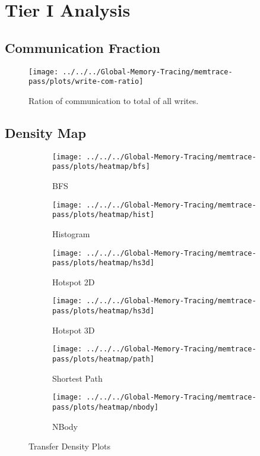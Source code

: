 \section{Tier I Analysis}
\subsection{Communication Fraction}
\begin{figure}[t]
	\centering
	\texttt{[image: ../../../Global-Memory-Tracing/memtrace-pass/plots/write-com-ratio]}
	\caption{Ration of communication to total of all writes.}
	\label{com-ratio}
\end{figure}
\subsection{Density Map}
\begin{figure}
	\begin{subfigure}[b]{0.45\textwidth}
		\texttt{[image: ../../../Global-Memory-Tracing/memtrace-pass/plots/heatmap/bfs]}
		\caption{BFS}
		\label{fig:density-bfs}
	\end{subfigure}
	\begin{subfigure}[b]{0.45\textwidth}
		\texttt{[image: ../../../Global-Memory-Tracing/memtrace-pass/plots/heatmap/hist]}
		\caption{Histogram}
		\label{fig:density-hist}
	\end{subfigure}
	\begin{subfigure}[b]{0.45\textwidth}
		\texttt{[image: ../../../Global-Memory-Tracing/memtrace-pass/plots/heatmap/hs3d]}
		\caption{Hotspot 2D}
		\label{fig:density-hs2d}
	\end{subfigure}
	\begin{subfigure}[b]{0.45\textwidth}
		\texttt{[image: ../../../Global-Memory-Tracing/memtrace-pass/plots/heatmap/hs3d]}
		\caption{Hotspot 3D}
		\label{fig:density-hs3d}
	\end{subfigure}
	\begin{subfigure}[b]{0.45\textwidth}
		\texttt{[image: ../../../Global-Memory-Tracing/memtrace-pass/plots/heatmap/path]}
		\caption{Shortest Path}
		\label{fig:density-path}
	\end{subfigure}
	\hfill
	\begin{subfigure}[b]{0.45\textwidth}
		\texttt{[image: ../../../Global-Memory-Tracing/memtrace-pass/plots/heatmap/nbody]}
		\caption{NBody}
		\label{fig:density-nbody}
	\end{subfigure}
	\caption{Transfer Density Plots}
	\label{fig:animals}
\end{figure}
